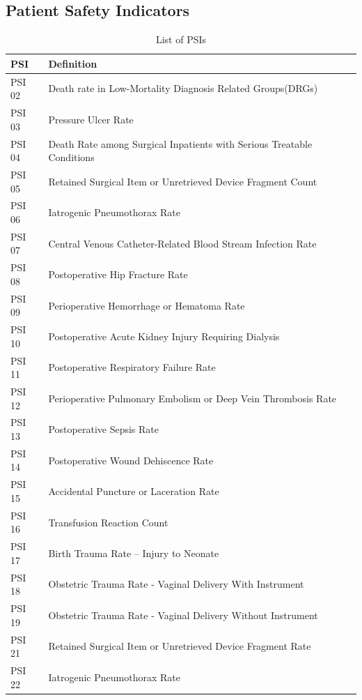 \documentclass{article}
\begin{document}
\begin{appendix}
    \section{Patient Safety Indicators}
    \begin{center}
    {\renewcommand{\arraystretch}{1.2}%
    \begin{longtable}{l| l{800pt}}
      \caption{List of PSIs}\\ 
        \textbf{PSI} & \textbf{Definition} \\
        \hline
        PSI 02 & Death rate in Low-Mortality Diagnosis Related Groups(DRGs) \\
        PSI 03 & Pressure Ulcer Rate\\
        PSI 04 & Death Rate among Surgical Inpatients with Serious Treatable Conditions\\
        PSI 05 & Retained Surgical Item or Unretrieved Device Fragment Count\\
        PSI 06 & Iatrogenic Pneumothorax Rate\\
        PSI 07 & Central Venous Catheter-Related Blood Stream Infection Rate \\
        PSI 08 & Postoperative Hip Fracture Rate\\
        PSI 09 & Perioperative Hemorrhage or Hematoma Rate\\
        PSI 10 & Postoperative Acute Kidney Injury Requiring Dialysis\\
        PSI 11 & Postoperative Respiratory Failure Rate\\
        PSI 12 & Perioperative Pulmonary Embolism or Deep Vein Thrombosis Rate\\
        PSI 13 & Postoperative Sepsis Rate\\
        PSI 14 & Postoperative Wound Dehiscence Rate\\
        PSI 15 & Accidental Puncture or Laceration Rate\\
        PSI 16 & Transfusion Reaction Count\\
        PSI 17 & Birth Trauma Rate – Injury to Neonate\\
        PSI 18 & Obstetric Trauma Rate - Vaginal Delivery With Instrument\\
        PSI 19 & Obstetric Trauma Rate - Vaginal Delivery Without Instrument\\
        PSI 21 & Retained Surgical Item or Unretrieved Device Fragment Rate\\
        PSI 22 & Iatrogenic Pneumothorax Rate\\

\end{longtable}}
\end{center}
\end{appendix}
\end{document}

